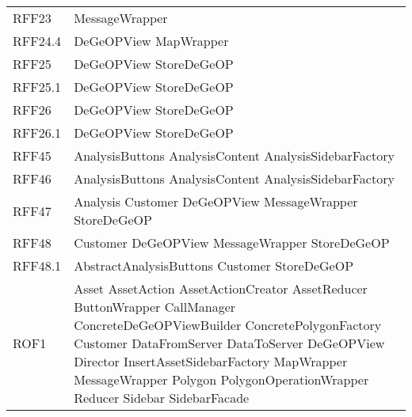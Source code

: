 \begin{longtable}{p{2.5cm}!{\VRule[1pt]}p{5cm}}
		RFF23 & MessageWrapper\\
		RFF24.4 & DeGeOPView \newline MapWrapper\\
		RFF25 & DeGeOPView \newline StoreDeGeOP\\
		RFF25.1 & DeGeOPView \newline StoreDeGeOP\\
		RFF26 & DeGeOPView \newline StoreDeGeOP\\
		RFF26.1 & DeGeOPView \newline StoreDeGeOP\\
		RFF45 & AnalysisButtons \newline AnalysisContent \newline AnalysisSidebarFactory\\
		RFF46 & AnalysisButtons \newline AnalysisContent \newline AnalysisSidebarFactory\\
		RFF47 & Analysis \newline Customer \newline DeGeOPView \newline MessageWrapper \newline StoreDeGeOP\\
		RFF48 & Customer \newline DeGeOPView \newline MessageWrapper \newline StoreDeGeOP\\
		RFF48.1 & AbstractAnalysisButtons \newline Customer \newline StoreDeGeOP\\
		ROF1 & Asset \newline AssetAction \newline AssetActionCreator \newline AssetReducer \newline ButtonWrapper \newline CallManager \newline ConcreteDeGeOPViewBuilder \newline ConcretePolygonFactory \newline Customer \newline DataFromServer \newline DataToServer \newline DeGeOPView \newline Director \newline InsertAssetSidebarFactory \newline MapWrapper \newline MessageWrapper \newline Polygon \newline PolygonOperationWrapper \newline Reducer \newline Sidebar \newline SidebarFacade\\

\end{longtable}
